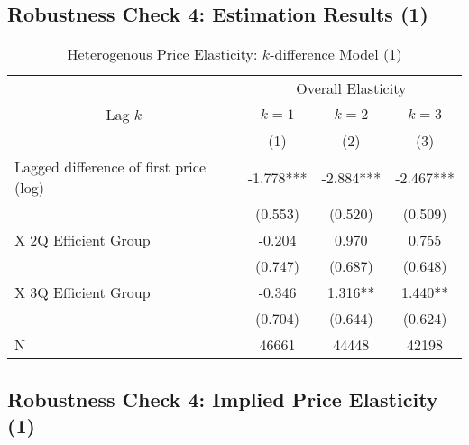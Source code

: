 \documentclass[ review  , 3p ]{elsarticle}
\begin{document}
  \hypertarget{robustness-check-4-estimation-results-1}{%
  \subsection{Robustness Check 4: Estimation Results (1)}\label{robustness-check-4-estimation-results-1}}

  \begin{table}

  \caption{\label{tab:kableHeterokDiffElasticitySlide1}Heterogenous Price Elasticity: $k$-difference Model (1)}
  \centering
  \fontsize{8}{10}\selectfont
  \begin{tabular}[t]{lccc}
  \toprule
  \multicolumn{1}{c}{ } & \multicolumn{3}{c}{Overall Elasticity} \\
  \cmidrule(l{3pt}r{3pt}){2-4}
  \multicolumn{1}{c}{Lag $k$} & \multicolumn{1}{c}{$k = 1$} & \multicolumn{1}{c}{$k = 2$} & \multicolumn{1}{c}{$k = 3$} \\
  \cmidrule(l{3pt}r{3pt}){1-1} \cmidrule(l{3pt}r{3pt}){2-2} \cmidrule(l{3pt}r{3pt}){3-3} \cmidrule(l{3pt}r{3pt}){4-4}
   & (1) & (2) & (3)\\
  \midrule
  Lagged difference of first price (log) & -1.778*** & -2.884*** & -2.467***\\
   & (0.553) & (0.520) & (0.509)\\
  \hspace{1em}X 2Q Efficient Group & -0.204 & 0.970 & 0.755\\
   & (0.747) & (0.687) & (0.648)\\
  \hspace{1em}X 3Q Efficient Group & -0.346 & 1.316** & 1.440**\\
   & (0.704) & (0.644) & (0.624)\\
  N & 46661 & 44448 & 42198\\
  \bottomrule
  \end{tabular}
  \end{table}

  \hypertarget{robustness-check-4-implied-price-elasticity-1}{%
  \subsection{Robustness Check 4: Implied Price Elasticity (1)}\label{robustness-check-4-implied-price-elasticity-1}}
\end{document}
